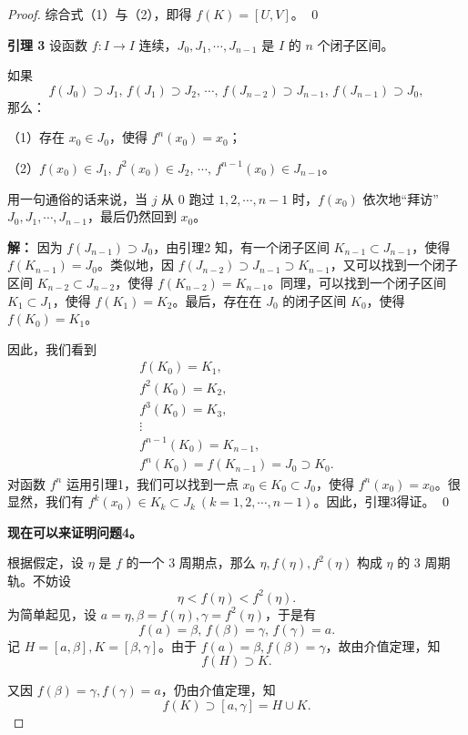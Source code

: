 \documentclass[12pt]{ctexart}
\begin{document}
\begin{proof}
综合式（1）与（2），即得 $f(K) = [U, V]$。
\qed

\textbf{引理 3} 设函数 $f: I \to I$ 连续，$J_0, J_1, \cdots, J_{n-1}$ 是 $I$ 的 $n$ 个闭子区间。

如果
\[
f(J_0) \supset J_1, \, f(J_1) \supset J_2, \, \cdots, \, f(J_{n-2}) \supset J_{n-1}, \, f(J_{n-1}) \supset J_0,
\]
那么：

\quad（1）存在 $x_0 \in J_0$，使得 $f^n(x_0) = x_0$；

\quad（2）$f(x_0) \in J_1, \, f^2(x_0) \in J_2, \, \cdots, \, f^{n-1}(x_0) \in J_{n-1}$。

用一句通俗的话来说，当 $j$ 从 $0$ 跑过 $1, 2, \cdots, n-1$ 时，$f(x_0)$ 依次地“拜访” $J_0, J_1, \cdots, J_{n-1}$，最后仍然回到 $x_0$。

\textbf{解：} 因为 $f(J_{n-1}) \supset J_0$，由引理2 知，有一个闭子区间 $K_{n-1} \subset J_{n-1}$，使得 $f(K_{n-1}) = J_0$。类似地，因 $f(J_{n-2}) \supset J_{n-1} \supset K_{n-1}$，又可以找到一个闭子区间 $K_{n-2} \subset J_{n-2}$，使得 $f(K_{n-2}) = K_{n-1}$。同理，可以找到一个闭子区间 $K_1 \subset J_1$，使得 $f(K_1) = K_2$。最后，存在在 $J_0$ 的闭子区间 $K_0$，使得 $f(K_0) = K_1$。

因此，我们看到
\[
\begin{array}{l}
f(K_0) = K_1, \\
f^2(K_0) = K_2, \\
f^3(K_0) = K_3, \\
\vdots \\
f^{n-1}(K_0) = K_{n-1}, \\
f^n(K_0) = f(K_{n-1}) = J_0 \supset K_0.
\end{array}
\]
对函数 $f^n$ 运用引理1，我们可以找到一点 $x_0 \in K_0 \subset J_0$，使得 $f^n(x_0) = x_0$。很显然，我们有 $f^k(x_0) \in K_k \subset J_k \ (k = 1, 2, \cdots, n-1)$。因此，引理3得证。
\qed 

\quad \textbf{现在可以来证明问题4。}

根据假定，设 $\eta$ 是 $f$ 的一个 3 周期点，那么 $\eta, f(\eta), f^2(\eta)$ 构成 $\eta$ 的 3 周期轨。不妨设
\[
\eta < f(\eta) < f^2(\eta).
\]
为简单起见，设 $a = \eta, \beta = f(\eta), \gamma = f^2(\eta)$，于是有
\[
f(a) = \beta, \, f(\beta) = \gamma, \, f(\gamma) = a.
\]
记 $H = [a, \beta], K = [\beta, \gamma]$。由于 $f(a) = \beta, f(\beta) = \gamma$，故由介值定理，知
\begin{equation}
f(H) \supset K. \tag{3}
\end{equation}

又因 $f(\beta) = \gamma, f(\gamma) = a$，仍由介值定理，知
\begin{equation}
f(K) \supset [a, \gamma] = H \cup K. \tag{4}
\end{equation}


\end{proof}
\end{document}
